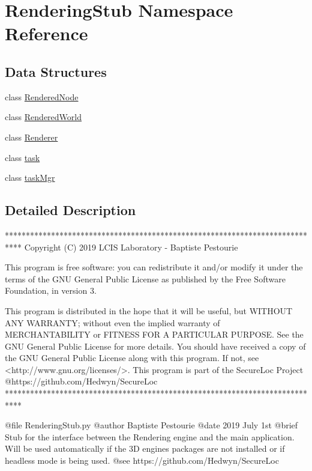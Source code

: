 \hypertarget{namespace_rendering_stub}{}\section{Rendering\+Stub Namespace Reference}
\label{namespace_rendering_stub}
\subsection*{Data Structures}
\begin{DoxyCompactItemize}
\item 
class \mbox{\hyperlink{class_rendering_stub_1_1_rendered_node}{Rendered\+Node}}
\item 
class \mbox{\hyperlink{class_rendering_stub_1_1_rendered_world}{Rendered\+World}}
\item 
class \mbox{\hyperlink{class_rendering_stub_1_1_renderer}{Renderer}}
\item 
class \mbox{\hyperlink{class_rendering_stub_1_1task}{task}}
\item 
class \mbox{\hyperlink{class_rendering_stub_1_1task_mgr}{task\+Mgr}}
\end{DoxyCompactItemize}


\subsection{Detailed Description}
\begin{DoxyVerb}****************************************************************************
Copyright (C) 2019 LCIS Laboratory - Baptiste Pestourie

This program is free software: you can redistribute it and/or modify
it under the terms of the GNU General Public License as published by
the Free Software Foundation, in version 3.

This program is distributed in the hope that it will be useful,
but WITHOUT ANY WARRANTY; without even the implied warranty of
MERCHANTABILITY or FITNESS FOR A PARTICULAR PURPOSE. See the
GNU General Public License for more details.
You should have received a copy of the GNU General Public License
along with this program. If not, see <http://www.gnu.org/licenses/>.
This program is part of the SecureLoc Project @https://github.com/Hedwyn/SecureLoc
 ****************************************************************************

@file RenderingStub.py
@author Baptiste Pestourie
@date 2019 July 1st
@brief Stub for the interface between the Rendering engine and the main application.
Will be used automatically if the 3D engines packages are not installed
or if headless mode is being used.
@see https://github.com/Hedwyn/SecureLoc
\end{DoxyVerb}
 